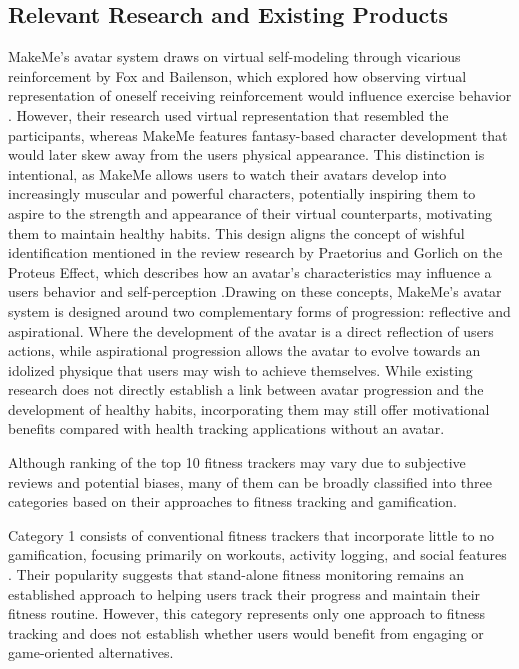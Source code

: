 \documentclass[11pt]{article}
\begin{document}
\subsection{Relevant Research and Existing Products}
MakeMe’s avatar system draws on virtual self-modeling through vicarious reinforcement by Fox
and Bailenson, which explored how observing virtual representation of oneself receiving reinforcement
would influence exercise behavior \cite{fox2009VRS}. However, their research used virtual representation that
resembled the participants, whereas MakeMe features fantasy-based character development that would
later skew away from the users physical appearance. This distinction is intentional, as MakeMe allows
users to watch their avatars develop into increasingly muscular and powerful characters, potentially
inspiring them to aspire to the strength and appearance of their virtual counterparts, motivating them
to maintain healthy habits. This design aligns the concept of wishful identification mentioned in the
review research by Praetorius and Gorlich on the Proteus Effect, which describes how an avatar's characteristics
may influence a users behavior and self-perception \cite{praetorius2020avatars}.Drawing on these concepts, MakeMe’s
avatar system is designed around two complementary forms of progression: reflective and aspirational. Where the development
of the avatar is a direct reflection of users actions, while aspirational progression allows the avatar to evolve towards
an idolized physique that users may wish to achieve themselves. While existing research does not directly establish
a link between avatar progression and the development of healthy habits, incorporating them may still offer
motivational benefits compared with health tracking applications without an avatar.

Although ranking of the top 10 fitness trackers may vary due to subjective
reviews and potential biases, many of them can be broadly classified into three categories based on their approaches
to fitness tracking and gamification.

Category 1 consists of conventional fitness trackers that incorporate little to no gamification,
focusing primarily on workouts, activity logging, and social features \cite{hall2026bestfitnessapps, herman2026bestfitnessapps}. Their
popularity suggests that stand-alone fitness monitoring remains an established approach to helping users
track their progress and maintain their fitness routine. However, this category represents only one approach
to fitness tracking and does not establish whether users would benefit from engaging or game-oriented alternatives.
\end{document}
